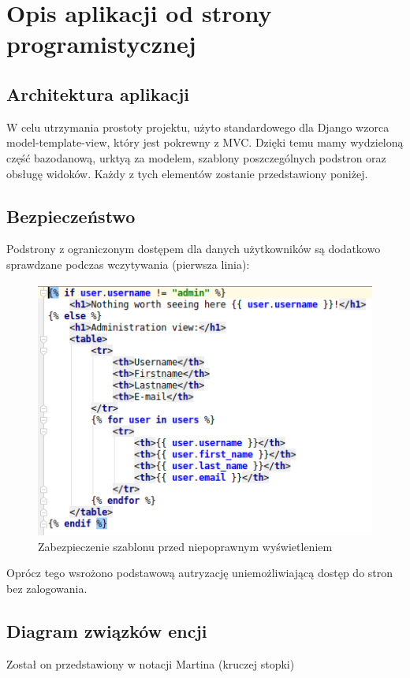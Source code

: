 \documentclass[12pt]{article}
\begin{document}
\section{Opis aplikacji od strony programistycznej}
\subsection{Architektura aplikacji}
W celu utrzymania prostoty projektu, użyto standardowego dla Django wzorca model-template-view, który jest pokrewny z MVC. Dzięki temu mamy wydzieloną część bazodanową, urktyą za modelem, szablony poszczególnych podstron oraz obsługę widoków. Każdy z tych elementów zostanie przedstawiony poniżej.

\subsection{Bezpieczeństwo}
Podstrony z ograniczonym dostępem dla danych użytkowników są dodatkowo sprawdzane podczas wczytywania (pierwsza linia):
\begin{figure}[H]
	\centering
	\includegraphics[scale=0.7]{img/c_template_security.png}
	\caption{Zabezpieczenie szablonu przed niepoprawnym wyświetleniem}
\end{figure}
Oprócz tego wsrożono podstawową autryzację uniemożliwiającą dostęp do stron bez zalogowania.

\subsection{Diagram związków encji}
Został on przedstawiony w notacji Martina (kruczej stopki)
\end{document}
